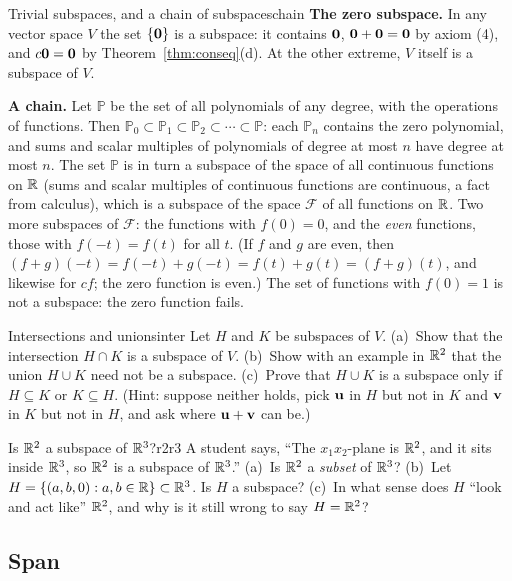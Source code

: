 \documentclass[11pt]{article}
\begin{document}
\begin{exmp}{Trivial subspaces, and a chain of subspaces}{chain}
\textbf{The zero subspace.} In any vector space $V$ the set $\{\mathbf{0}\}$ is a subspace: it contains $\mathbf{0}$, $\mathbf{0}+\mathbf{0}=\mathbf{0}$ by axiom (4), and $c\mathbf{0}=\mathbf{0}$ by Theorem~\ref{thm:conseq}(d). At the other extreme, $V$ itself is a subspace of $V$.

\textbf{A chain.} Let $\mathbb{P}$ be the set of all polynomials of any degree, with the operations of functions. Then $\mathbb{P}_0\subset\mathbb{P}_1\subset\mathbb{P}_2\subset\cdots\subset\mathbb{P}$: each $\mathbb{P}_n$ contains the zero polynomial, and sums and scalar multiples of polynomials of degree at most $n$ have degree at most $n$. The set $\mathbb{P}$ is in turn a subspace of the space of all continuous functions on $\mathbb{R}$ (sums and scalar multiples of continuous functions are continuous, a fact from calculus), which is a subspace of the space $\mathcal{F}$ of all functions on $\mathbb{R}$. Two more subspaces of $\mathcal{F}$: the functions with $f(0)=0$, and the \emph{even} functions, those with $f(-t)=f(t)$ for all $t$. (If $f$ and $g$ are even, then $(f+g)(-t)=f(-t)+g(-t)=f(t)+g(t)=(f+g)(t)$, and likewise for $cf$; the zero function is even.) The set of functions with $f(0)=1$ is not a subspace: the zero function fails.
\end{exmp}

\begin{think}{Intersections and unions}{inter}
Let $H$ and $K$ be subspaces of $V$. (a)~Show that the intersection $H\cap K$ is a subspace of $V$. (b)~Show with an example in $\mathbb{R}^2$ that the union $H\cup K$ need not be a subspace. (c)~Prove that $H\cup K$ is a subspace only if $H\subseteq K$ or $K\subseteq H$. (Hint: suppose neither holds, pick $\mathbf{u}$ in $H$ but not in $K$ and $\mathbf{v}$ in $K$ but not in $H$, and ask where $\mathbf{u}+\mathbf{v}$ can be.)
\end{think}

\begin{think}{Is $\mathbb{R}^2$ a subspace of $\mathbb{R}^3$?}{r2r3}
A student says, ``The $x_1x_2$-plane is $\mathbb{R}^2$, and it sits inside $\mathbb{R}^3$, so $\mathbb{R}^2$ is a subspace of $\mathbb{R}^3$.'' (a)~Is $\mathbb{R}^2$ a \emph{subset} of $\mathbb{R}^3$? (b)~Let $H=\{(a,b,0):a,b\in\mathbb{R}\}\subset\mathbb{R}^3$. Is $H$ a subspace? (c)~In what sense does $H$ ``look and act like'' $\mathbb{R}^2$, and why is it still wrong to say $H=\mathbb{R}^2$?
\end{think}

\subsection*{Span}
\end{document}
